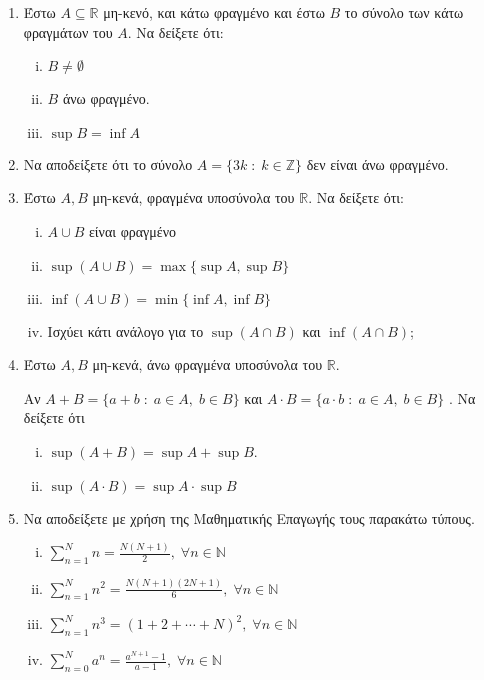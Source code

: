 \begin{enumerate}
    \item Έστω $ A \subseteq \mathbb{R} $ μη-κενό, και κάτω φραγμένο και έστω 
        $ B $ το σύνολο των κάτω φραγμάτων του $A$. Να δείξετε ότι:
        \begin{enumerate}[i)]
            \item $ B \neq \emptyset $
            \item $B$ άνω φραγμένο.
            \item $ \sup B = \inf A $
        \end{enumerate}

    \item \label{ask:3z} Να αποδείξετε ότι το σύνολο $ A = \{ 3k \; : \; k \in \mathbb{Z} \} $ 
        δεν είναι άνω φραγμένο.

    \item Έστω $ A,B $ μη-κενά, φραγμένα υποσύνολα του $ \mathbb{R} $. Να 
        δείξετε ότι:
        \begin{enumerate}[i)]
            \item $ A \cup B  $ είναι φραγμένο
            \item $ \sup {(A\cup B)} = \max \{ \sup A, \sup B \} $
            \item $ \inf {(A\cup B)} = \min \{ \inf A, \inf B \} $
            \item Ισχύει κάτι ανάλογο για το $ \sup {(A\cap B)} $ και 
                $ \inf {(A\cap B)} $;
        \end{enumerate}

    \item Έστω $ A, B $ μη-κενά, άνω φραγμένα υποσύνολα του $ \mathbb{R} $.
        
        Αν $ A+B = \{ a+b \; : \; a \in A, \; b\in B \} $ και $A \cdot B = 
        \{ a\cdot b \; : \; a \in A, \; b \in B\}$ . Να δείξετε ότι 
        \begin{enumerate}[i)]
            \item $ \sup {(A+B)} = \sup A + \sup B $.
            \item $ \sup {(A\cdot B)} = \sup A \cdot \sup B $
        \end{enumerate}

    \item Να αποδείξετε με χρήση της Μαθηματικής Επαγωγής τους παρακάτω τύπους.
        \begin{enumerate}[i)]
            \item $ \sum_{n=1}^{N} n = \frac{N(N+1)}{2},\; \forall n \in
                \mathbb{N} $
            \item $ \sum_{n=1}^{N} n^{2} = \frac{N(N+1)(2N+1)}{6},\; \forall 
                n \in \mathbb{N} $
            \item $ \sum_{n=1}^{N} n^{3} = (1+2+\cdots + N)^{2}, \; 
                \forall n \in \mathbb{N} $
            \item $ \sum_{n=0}^{N} a^{n} = \frac{a^{N+1} - 1}{a-1},\; 
                \forall n \in \mathbb{N}$
        \end{enumerate}


\end{enumerate}
